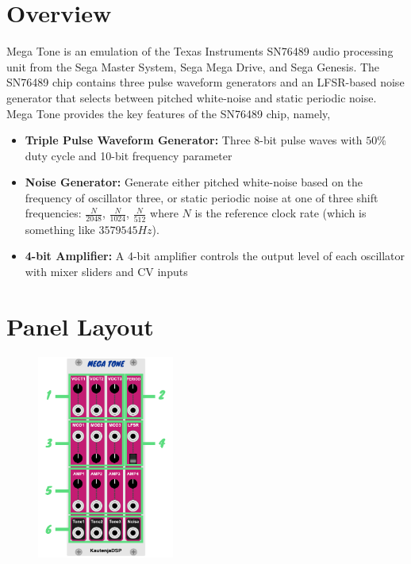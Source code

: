 \documentclass[12pt,letter]{article}
\begin{document}


\section*{Overview}

Mega Tone is an emulation of the Texas Instruments SN76489 audio processing unit from the Sega Master System, Sega Mega Drive, and Sega Genesis. The SN76489 chip contains three pulse waveform generators and an LFSR-based noise generator that selects between pitched white-noise and static periodic noise. Mega Tone provides the key features of the SN76489 chip, namely,
\begin{itemize}
  \item \textbf{Triple Pulse Waveform Generator:} Three 8-bit pulse waves with $50\%$ duty cycle and 10-bit frequency parameter
  \item \textbf{Noise Generator:} Generate either pitched white-noise based on the frequency of oscillator three, or static periodic noise at one of three shift frequencies: $\frac{N}{2048}$, $\frac{N}{1024}$, $\frac{N}{512}$ where $N$ is the reference clock rate (which is something like $3579545Hz$).
  \item \textbf{4-bit Amplifier:} A 4-bit amplifier controls the output level of each oscillator with mixer sliders and CV inputs
\end{itemize}


\section*{Panel Layout}

\begin{figure}[!htp]
\centering
\includegraphics[width=0.4\textwidth]{MegaTone-Manual}
\end{figure}
\end{document}
